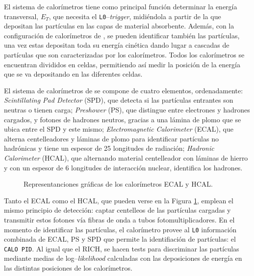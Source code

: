 El sistema de calorímetros tiene como principal función determinar la energía \color{vero} transversal, \color{norm} $E_T$, que necesita el \texttt{L0}--\emph{trigger}, midiéndola a partir de la que depositan las partículas en las capas de material absorbente. 
Además, con la configuración de calorímetros de \lhcb, se pueden identificar también las partículas, una vez estas depositan toda su energía cinética dando lugar a cascadas de partículas que son caracterizadas por los calorímetros. Todos los calorímetros se encuentran divididos en celdas, permitiendo así medir la posición de la energía que se va depositando en las diferentes celdas.



El sistema de calorímetros de \lhcb \cite{Alves:1129809} se compone de cuatro elementos, ordenadamente: \emph{Scintillating Pad Detector} (SPD), que detecta si las partículas entrantes son neutras o tienen carga; \emph{Preshower} (PS), que distingue entre electrones y hadrones cargados, y fotones de hadrones neutros, gracias a una lámina de plomo que se ubica entre el SPD y este mismo; \emph{Electromagnetic Calorimeter} (ECAL), que alterna centelleadores y láminas de plomo para identificar partículas no hadrónicas y tiene un espesor de 25 longitudes de radiación; \emph{Hadronic Calorimeter} (HCAL), que alternando material centelleador con láminas de hierro y con un espesor de 6 longitudes de interacción nuclear, identifica los hadrones.

\begin{figure}[H]
\centering
{} \hfill
{} \hfill
\caption{Representanciones gráficas de los calorímetros ECAL y HCAL.} \label{fig_calos}
\end{figure}

Tanto el ECAL como el HCAL, que pueden verse en la Figura \ref{fig_calos}, emplean el mismo principio de detección: captar centelleos de las partículas cargadas y transmitir estos fotones vía fibras de onda a tubos fotomultiplicadores. 
%
En el momento de identificar las partículas, el calorímetro provee al \texttt{L0} información combinada de ECAL, PS y SPD que permite la identifiación de partículas: el \texttt{CALO PID}.
%
Al igual que el RICH, se hacen tests para discriminar las partículas mediante medias de log--\emph{likelihood} calculadas con las deposiciones de energía en las distintas posiciones de los calorímetros.

